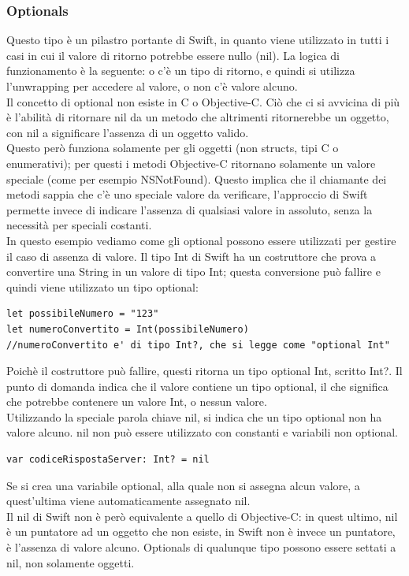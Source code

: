 \subsubsection{Optionals}
Questo tipo è un pilastro portante di Swift, in quanto viene utilizzato  in tutti i casi in cui il valore di ritorno potrebbe essere nullo (nil). La logica di funzionamento è la seguente: o c'è un tipo di ritorno, e quindi si utilizza l'unwrapping per accedere al valore, o non c'è valore alcuno.\\
Il concetto di optional non esiste in C o Objective-C. Ciò che ci si avvicina di più è l'abilità di ritornare nil da un metodo che altrimenti ritornerebbe un oggetto, con nil a significare l'assenza di un oggetto valido.\\Questo però funziona solamente per gli oggetti (non structs, tipi C  o enumerativi); per questi i metodi Objective-C ritornano solamente un valore speciale (come per esempio NSNotFound). Questo implica che il chiamante dei metodi sappia che c'è uno speciale valore da verificare, l'approccio di Swift permette invece di indicare l'assenza di qualsiasi valore in assoluto, senza la necessità per speciali costanti.\\
In questo esempio vediamo come gli optional possono essere utilizzati per gestire il caso di assenza di valore. Il tipo Int di Swift ha un costruttore che prova a convertire una String  in un valore di tipo Int; questa conversione può fallire e quindi viene utilizzato un tipo optional:
\lstset{language=[Objective]C, breakindent=40pt, breaklines}
\begin{lstlisting}
let possibileNumero = "123"
let numeroConvertito = Int(possibileNumero)
//numeroConvertito e' di tipo Int?, che si legge come "optional Int"
\end{lstlisting} 
Poichè il costruttore può fallire, questi ritorna un tipo optional Int, scritto Int?. Il punto di domanda indica che il valore contiene un tipo optional, il che significa che potrebbe contenere un valore Int, o nessun valore.\\
Utilizzando la speciale parola chiave nil, si indica che un tipo optional non ha valore alcuno. nil non può essere utilizzato con constanti e variabili non optional.
\lstset{language=[Objective]C, breakindent=40pt, breaklines}
\begin{lstlisting}
var codiceRispostaServer: Int? = nil
\end{lstlisting}
Se si crea una variabile optional, alla quale non si assegna alcun valore, a quest'ultima viene automaticamente assegnato nil.\\Il nil di Swift non è però equivalente a quello di Objective-C: in quest ultimo, nil è un puntatore ad un oggetto che non esiste, in Swift non è invece un puntatore, è l'assenza di valore alcuno. Optionals di qualunque tipo possono essere settati a nil, non solamente oggetti.\\
